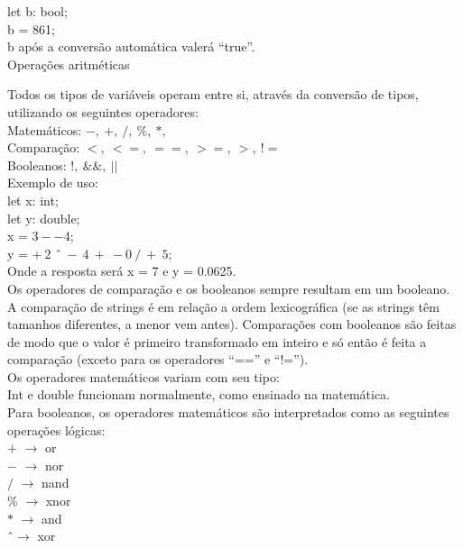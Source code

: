 \documentclass[12pt,a4paper]{article}
\begin{document}
let b: bool; \\

b = 861;\\

b após a conversão automática valerá ``true''.\\

\hypertarget{label3}{\Large{Operações aritméticas}}\\[0.3cm]
\normalsize

Todos os tipos de variáveis operam entre si, através da conversão de tipos, utilizando os seguintes operadores:\\[0.2cm]
Matemáticos: $-,\ +,\ /,\ \%,\ *,$ \^\\
Comparação: $<,\ <=,\ ==,\ >=,\ >,\ !=$\\
Booleanos: $!,\ \&\&,\ ||$\\[0.6cm]
Exemplo de uso:\\[0.3cm]
let x: int;\\
let y: double;\\

x = $3--4$;\\

y = $+\ 2$ \^\ $\ -\ 4\ +\ -0\ /\ +\ 5$;\\[0.5cm]
Onde a resposta será x = 7 e y = 0.0625.\\


Os operadores de comparação e os booleanos sempre resultam em um booleano. A comparação de strings é em relação a ordem lexicográfica (se as strings têm tamanhos diferentes, a menor vem antes). Comparações com booleanos são feitas de modo que o valor é primeiro transformado em inteiro e só então é feita a comparação (exceto para os operadores ``=='' e ``!='').\\

Os operadores matemáticos variam com seu tipo:\\
Int e double funcionam normalmente, como ensinado na matemática.\\

Para booleanos, os operadores matemáticos são interpretados como as seguintes operações lógicas:\\[0.2cm]
$+$ $\rightarrow$ or\\
$-$ $\rightarrow$ nor\\
$/$ $\rightarrow$ nand\\
\% $\rightarrow$ xnor\\
$*$ $\rightarrow$ and\\
\^ \ $\rightarrow$ xor\\
\end{document}
